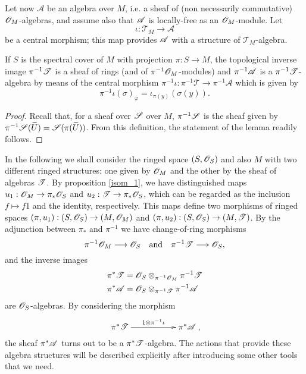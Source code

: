 Let now $\mathscr{A}$ be an algebra over $M$, i.e. a sheaf of (non necessarily commutative) $\mathscr{O}_M$-algebras, and assume also that $\mathscr{A}$ is locally-free as an $\mathscr{O}_M$-module. Let
$$\iota :\mathscr{T}_M\longrightarrow \mathscr{A}$$
be a central morphism; this map provides $\mathscr{A}$ with a structure of $\mathscr{T}_M$-algebra.

\begin{lemma}
If $S$ is the spectral cover of $M$ with projection $\pi :S\rightarrow M$, the topological inverse image $\pi^{-1}\mathscr{T}$ is a sheaf of rings (and of $\pi^{-1}\mathscr{O}_M$-modules) and $\pi^{-1}\mathscr{A}$ is a $\pi^{-1}\mathscr{T}$-algebra by means of the central morphism $\pi^{-1}\iota :\pi^{-1}\mathscr{T}\longrightarrow \pi^{-1}\mathscr{A}$ which is given by
$$\pi^{-1}\iota (\sigma )_{\varphi }=\iota_{\pi (y)}(\sigma (y)).$$
\end{lemma}
\begin{proof}
Recall that, for a sheaf over $\mathscr{S}$ over $M$, $\pi^{-1}\mathscr{S}$ is the sheaf given by $\pi^{-1}\mathscr{S}(\widetilde{U})=\mathscr{S}(\pi (\widetilde{U}))$. From this definition, the statement of the lemma readily follows.
\end{proof}

In the following we shall consider the ringed space $(S,\mathscr{O}_S)$ and also $M$ with two different ringed structures: one given by $\mathscr{O}_M$ and the other by the sheaf of algebras $\mathscr{T}$. By proposition \ref{isom_1}, we have distinguished maps $u_1:\mathscr{O}_M\to \pi_*\mathscr{O}_S$ and $u_2:\mathscr{T}\to \pi_*\mathscr{O}_S$, which can be regarded as the inclusion $f\mapsto f1$ and the identity, respectively. This maps define two morphisms of ringed spaces $(\pi ,u_1):(S,\mathscr{O}_S)\to (M,\mathscr{O}_M)$ and $(\pi ,u_2):(S,\mathscr{O}_S)\to (M,\mathscr{T})$. By the adjunction between $\pi_*$ and $\pi^{-1}$ we have change-of-ring morphisms
\begin{equation}\label{change_of_rings}
\pi^{-1}\mathscr{O}_M\longrightarrow \mathscr{O}_S \quad \text{and} \quad \pi^{-1}\mathscr{T}\longrightarrow \mathscr{O}_S,
\end{equation}
and the inverse images
$$
\begin{aligned}
\pi^*\mathscr{T} &= \mathscr{O}_S\otimes_{\pi^{-1}\mathscr{O}_M}\pi^{-1}\mathscr{T} \\
\pi^*\mathscr{A}   &= \mathscr{O}_S\otimes_{\pi^{-1}\mathscr{T}}\pi^{-1}\mathscr{A} \\
\end{aligned}
$$
are $\mathscr{O}_S$-algebras. By considering the morphism
$$
\xymatrix{
\pi^*\scr{T} \ar[rr]^{1\otimes \pi^{-1}\iota} && \pi^*\scr{A} },$$
the sheaf $\pi^*\mathscr{A}$ turns out to be a $\pi^*\mathscr{T}$-algebra. The actions that provide these algebra structures will be described explicitly after introducing some other tools that we need.

